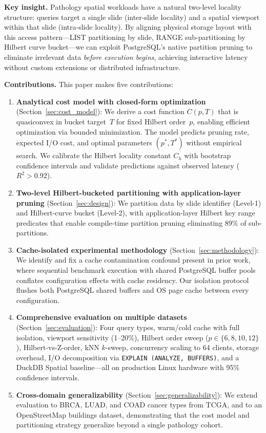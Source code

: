 \documentclass[sigconf]{acmart}
\begin{document}
\textbf{Key insight.}
Pathology spatial workloads have a natural two-level locality structure: queries target a single slide (inter-slide locality) and a spatial viewport within that slide (intra-slide locality).
By aligning physical storage layout with this access pattern---LIST partitioning by slide, RANGE sub-partitioning by Hilbert curve bucket---we can exploit PostgreSQL's native partition pruning to eliminate irrelevant data \emph{before execution begins}, achieving interactive latency without custom extensions or distributed infrastructure.

\textbf{Contributions.}
This paper makes five contributions:

\begin{enumerate}
\item \textbf{Analytical cost model with closed-form optimization} (Section~\ref{sec:cost_model}):
We derive a cost function $C(p, T)$ that is quasiconvex in bucket target~$T$ for fixed Hilbert order~$p$, enabling efficient optimization via bounded minimization.
The model predicts pruning rate, expected I/O cost, and optimal parameters $(p^*, T^*)$ without empirical search.
We calibrate the Hilbert locality constant $C_h$ with bootstrap confidence intervals and validate predictions against observed latency ($R^2 > 0.92$).

\item \textbf{Two-level Hilbert-bucketed partitioning with application-layer pruning} (Section~\ref{sec:design}):
We partition data by slide identifier (Level-1) and Hilbert-curve bucket (Level-2), with application-layer Hilbert key range predicates that enable compile-time partition pruning eliminating 89\% of sub-partitions.

\item \textbf{Cache-isolated experimental methodology} (Section~\ref{sec:methodology}):
We identify and fix a cache contamination confound present in prior work, where sequential benchmark execution with shared PostgreSQL buffer pools conflates configuration effects with cache residency.
Our isolation protocol flushes both PostgreSQL shared buffers and OS page cache between every configuration.

\item \textbf{Comprehensive evaluation on multiple datasets} (Section~\ref{sec:evaluation}):
Four query types, warm/cold cache with full isolation, viewport sensitivity (1--20\%), Hilbert order sweep ($p \in \{6,8,10,12\}$), Hilbert-vs-Z-order, kNN $k$-sweep, concurrency scaling to 64 clients, storage overhead, I/O decomposition via \texttt{EXPLAIN (ANALYZE, BUFFERS)}, and a DuckDB Spatial baseline---all on production Linux hardware with 95\% confidence intervals.

\item \textbf{Cross-domain generalizability} (Section~\ref{sec:generalizability}):
We extend evaluation to BRCA, LUAD, and COAD cancer types from TCGA, and to an OpenStreetMap buildings dataset, demonstrating that the cost model and partitioning strategy generalize beyond a single pathology cohort.
\end{enumerate}
\end{document}
